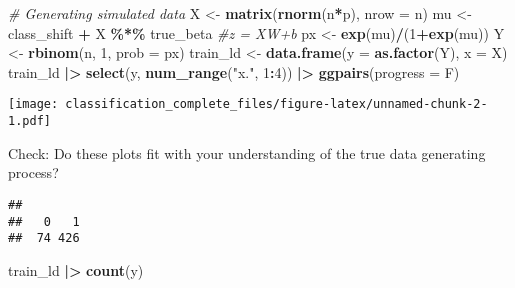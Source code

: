 \documentclass[
]{article}
\newenvironment{Shaded}{\begin{snugshade}}{\end{snugshade}}
\newcommand{\AttributeTok}[1]{\textcolor[rgb]{0.13,0.29,0.53}{#1}}
\newcommand{\CommentTok}[1]{\textcolor[rgb]{0.56,0.35,0.01}{\textit{#1}}}
\newcommand{\DecValTok}[1]{\textcolor[rgb]{0.00,0.00,0.81}{#1}}
\newcommand{\FunctionTok}[1]{\textcolor[rgb]{0.13,0.29,0.53}{\textbf{#1}}}
\newcommand{\NormalTok}[1]{#1}
\newcommand{\OtherTok}[1]{\textcolor[rgb]{0.56,0.35,0.01}{#1}}
\newcommand{\SpecialCharTok}[1]{\textcolor[rgb]{0.81,0.36,0.00}{\textbf{#1}}}
\newcommand{\StringTok}[1]{\textcolor[rgb]{0.31,0.60,0.02}{#1}}
\begin{document}
\begin{Shaded}
\begin{Highlighting}[]
\CommentTok{\# Generating simulated data}
\NormalTok{X }\OtherTok{\textless{}{-}} \FunctionTok{matrix}\NormalTok{(}\FunctionTok{rnorm}\NormalTok{(n}\SpecialCharTok{*}\NormalTok{p), }\AttributeTok{nrow =}\NormalTok{ n)}
\NormalTok{mu }\OtherTok{\textless{}{-}}\NormalTok{ class\_shift }\SpecialCharTok{+}\NormalTok{ X }\SpecialCharTok{\%*\%}\NormalTok{ true\_beta  }\CommentTok{\#z = XW+b }
\NormalTok{px }\OtherTok{\textless{}{-}} \FunctionTok{exp}\NormalTok{(mu)}\SpecialCharTok{/}\NormalTok{(}\DecValTok{1}\SpecialCharTok{+}\FunctionTok{exp}\NormalTok{(mu))}
\NormalTok{Y }\OtherTok{\textless{}{-}} \FunctionTok{rbinom}\NormalTok{(n, }\DecValTok{1}\NormalTok{, }\AttributeTok{prob =}\NormalTok{ px)}
\NormalTok{train\_ld }\OtherTok{\textless{}{-}} \FunctionTok{data.frame}\NormalTok{(}\AttributeTok{y =} \FunctionTok{as.factor}\NormalTok{(Y), }\AttributeTok{x =}\NormalTok{ X)}
\NormalTok{train\_ld }\SpecialCharTok{|\textgreater{}}
  \FunctionTok{select}\NormalTok{(y, }\FunctionTok{num\_range}\NormalTok{(}\StringTok{"x."}\NormalTok{, }\DecValTok{1}\SpecialCharTok{:}\DecValTok{4}\NormalTok{)) }\SpecialCharTok{|\textgreater{}}
  \FunctionTok{ggpairs}\NormalTok{(}\AttributeTok{progress =}\NormalTok{ F)}
\end{Highlighting}
\end{Shaded}

\texttt{[image: classification\_complete\_files/figure-latex/unnamed-chunk-2-1.pdf]}

Check: Do these plots fit with your understanding of the true data
generating process?

\begin{Shaded}
\end{Shaded}

\begin{verbatim}
## 
##   0   1 
##  74 426
\end{verbatim}

\begin{Shaded}
\begin{Highlighting}[]
\NormalTok{train\_ld }\SpecialCharTok{|\textgreater{}} \FunctionTok{count}\NormalTok{(y)}
\end{Highlighting}
\end{Shaded}
\end{document}
